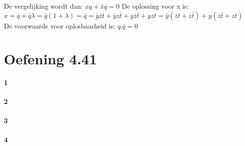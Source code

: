 \documentclass[12pt]{article}
\newcommand{\ov}[1]{\bar{#1}}
\begin{document}
De vergelijking wordt dan:
\vspace{2mm}
\newline
$xq + \ov{x}\ov{q} = 0$
\vspace{2mm}
\newline
De oplossing voor x is:
\vspace{2mm}
\newline
$x = \ov{q} + \ov{q}\lambda = \ov{q}(1+\lambda) = \ov{q} = \ov{y}\ov{z}t + \ov{y}z\ov{t} + y\ov{z}\ov{t} + yzt = \ov{y}(\ov{z}t + z\ov{t}) + y(\ov{z}\ov{t} + zt)$
\vspace{2mm}
\newline
De voorwaarde voor oplosbaarheid is:
\vspace{2mm}
\newline
$q.\ov{q} = 0$
\vspace{2mm}
\newline

\section{Oefening 4.41}
\paragraph{1}

\paragraph{2}

\paragraph{3}

\paragraph{4}
\end{document}
